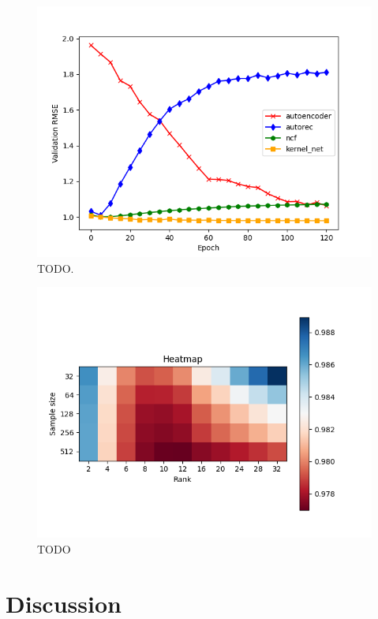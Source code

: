 \documentclass[10pt,conference,compsocconf]{IEEEtran}
\begin{document}
    \begin{figure}
        \includegraphics[width=\columnwidth]{figures/validation_plot.png}
        \caption{TODO.}
        \label{fig:validation}
    \end{figure}

    \begin{figure}
        \includegraphics[width=\columnwidth]{figures/heatmap.png}
        \caption{TODO}
        \label{fig:Heatmap}
    \end{figure}


    \section{Discussion}
\end{document}
